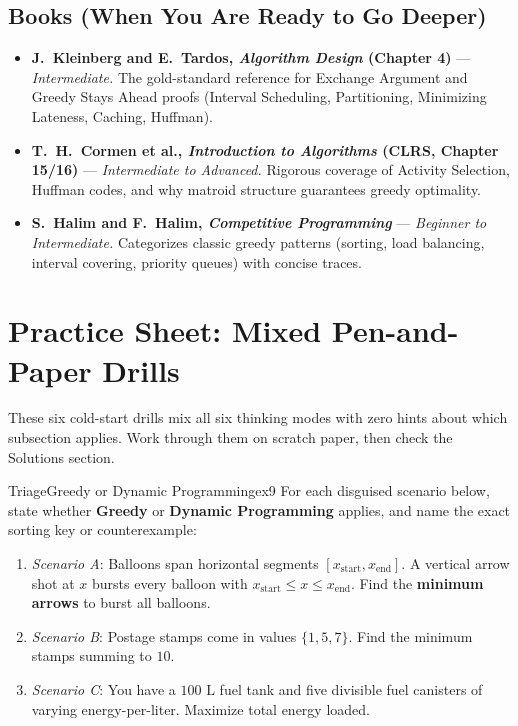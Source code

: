 \documentclass[11pt,a4paper]{article}
\theoremstyle{definition}
\begin{document}
\subsection*{Books (When You Are Ready to Go Deeper)}
\begin{itemize}
    \item \textbf{J.\ Kleinberg and E.\ Tardos, \emph{Algorithm Design} (Chapter 4)} --- \emph{Intermediate.} The gold-standard reference for Exchange Argument and Greedy Stays Ahead proofs (Interval Scheduling, Partitioning, Minimizing Lateness, Caching, Huffman).
    \item \textbf{T.\ H.\ Cormen et al., \emph{Introduction to Algorithms} (CLRS, Chapter 15/16)} --- \emph{Intermediate to Advanced.} Rigorous coverage of Activity Selection, Huffman codes, and why matroid structure guarantees greedy optimality.
    \item \textbf{S.\ Halim and F.\ Halim, \emph{Competitive Programming}} --- \emph{Beginner to Intermediate.} Categorizes classic greedy patterns (sorting, load balancing, interval covering, priority queues) with concise traces.
\end{itemize}

\section*{Practice Sheet: Mixed Pen-and-Paper Drills}

These six cold-start drills mix all six thinking modes with zero hints about which subsection applies. Work through them on scratch paper, then check the Solutions section.

\begin{tryitbox}{Triage}{Greedy or Dynamic Programming}{ex9}
For each disguised scenario below, state whether \textbf{Greedy} or \textbf{Dynamic Programming} applies, and name the exact sorting key or counterexample:
\begin{enumerate}[itemsep=1pt, topsep=2pt]
    \item \emph{Scenario A}: Balloons span horizontal segments $[x_{\text{start}}, x_{\text{end}}]$. A vertical arrow shot at $x$ bursts every balloon with $x_{\text{start}} \le x \le x_{\text{end}}$. Find the \textbf{minimum arrows} to burst all balloons.
    \item \emph{Scenario B}: Postage stamps come in values $\{1, 5, 7\}$. Find the minimum stamps summing to $10$.
    \item \emph{Scenario C}: You have a $100\text{ L}$ fuel tank and five divisible fuel canisters of varying energy-per-liter. Maximize total energy loaded.
\end{enumerate}
\end{tryitbox}
\end{document}
